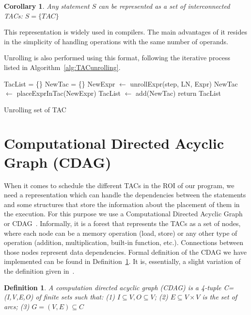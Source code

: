 \documentclass[a4paper,12pt]{memoir}
\newtheorem{definition}{Definition}[]
\newtheorem{corollary}{Corollary}[]
\begin{document}
\begin{corollary}\label{cor:TAC}
	Any statement $S$ can be represented as a set of interconnected TACs:
	$S = \{TAC\}$
\end{corollary}

This representation is widely used in compilers. The main advantages of it 
resides in the simplicity of handling operations with the same number of 
operands. 

Unrolling is also performed using this format, following the iterative process 
listed in 
Algorithm~\ref{alg:TACunrolling}.

\begin{algorithm}[H]\label{alg:TACunrolling}
	\SetAlgoLined
	TacList = \{\}\;
	 {
		 {
			 {
				NewTac = \{\}\;
				 {
					NewExpr $\leftarrow$ unrollExpr(step, LN, Expr)\;
					NewTac $\leftarrow$ placeExprInTac(NewExpr)\;
				}
				TacList $\leftarrow$ add(NewTac)\;
			}
		}
	}
	return TacList\;
	\caption{Unrolling set of TAC}
\end{algorithm}


\section{Computational Directed Acyclic Graph (CDAG)}
When it comes to schedule the different TACs in the ROI of our program, we need
a representation which can handle the dependencies between the statements and
some structures that store the information about the placement of them in the
execution. For this purpose we use a Computational Directed Acyclic Graph or 
CDAG~\cite{bib:CDAGdefinition}. Informally, it is a forest that represents the 
TACs as a set of nodes, where 
each node can be a memory operation (load, store) or any other type of 
operation (addition, multiplication, built-in function, etc.). Connections 
between those nodes represent data dependencies. Formal 
definition of the CDAG we have implemented can be found in 
Definition~\ref{def:CDAG}. It is, essentially, a slight variation 
of the definition given in~\cite{bib:CDAGdefinition}.

\theoremstyle{definition}
\begin{definition}\label{def:CDAG}
	A computation directed acyclic graph (CDAG) is a 4-tuple C=(I,V,E,O) of 
	finite sets such that: (1) $I \subseteq V, O \subseteq V$; (2) $E 
	\subseteq V 
	\times V$ is the set of arcs; (3) $G=(V,E) \subseteq C$
\end{definition}
\end{document}
